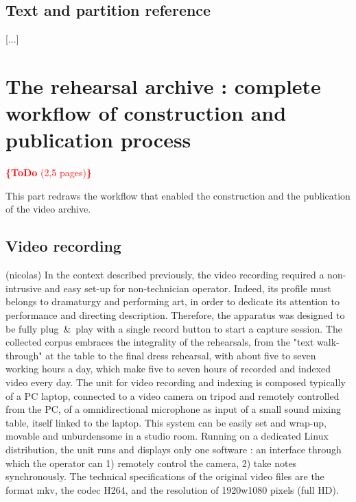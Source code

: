 \documentclass[conference]{IEEEtran}
\newcommand{\todo}[1]{\noindent\textcolor{red}{{\bf \{ToDo} #1{\bf \}}}}
\begin{document}
\subsection{Text and partition reference}
[...]



\section{The rehearsal archive : complete workflow of construction and publication process}
\todo{(2,5 pages)}

This part redraws the workflow that enabled the construction and the publication of the video archive.


\subsection{Video recording}  (nicolas)
In the context described previously, the video recording required a non-intrusive and easy set-up for non-technician operator. Indeed, its profile must belongs to dramaturgy and performing art, in order to dedicate its attention to performance and directing description. Therefore, the apparatus was designed to be fully plug\ \&\ play with a single record button to start a capture session.
The collected corpus embraces the integrality of the rehearsals, from the "text walk-through" at the table to the final dress rehearsal, with about five to seven working hours a day, which make five to seven hours of recorded and indexed video every day.
The unit for video recording and indexing is composed typically of a PC laptop, connected to a video camera on tripod and remotely controlled from the PC, of a omnidirectional microphone as input of a small sound mixing table, itself linked to the laptop. This system can be easily set and wrap-up, movable and unburdensome in a studio room. Running on a dedicated Linux distribution, the unit runs and displays only one software : an interface through which the operator can 1) remotely control the camera, 2) take notes synchronously. 
The technical specifications of the original video files are the format mkv, the codec H264, and the resolution of 1920w1080 pixels (full HD).
\end{document}

